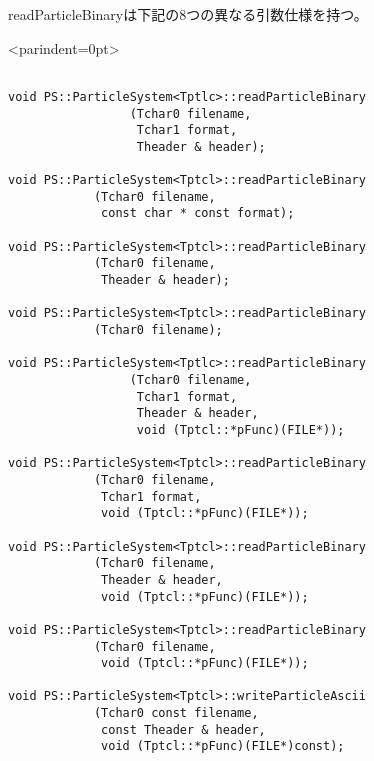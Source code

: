 \label{sec:readParticleBinary}

readParticleBinaryは下記の8つの異なる引数仕様を持つ。
\begin{breakitembox}<parindent=0pt>{}
\begin{verbatim}

void PS::ParticleSystem<Tptlc>::readParticleBinary
                 (Tchar0 filename,
                  Tchar1 format,
                  Theader & header);

void PS::ParticleSystem<Tptcl>::readParticleBinary
            (Tchar0 filename,
             const char * const format); 
             
void PS::ParticleSystem<Tptcl>::readParticleBinary
            (Tchar0 filename,
             Theader & header);

void PS::ParticleSystem<Tptcl>::readParticleBinary
            (Tchar0 filename);

void PS::ParticleSystem<Tptlc>::readParticleBinary
                 (Tchar0 filename,
                  Tchar1 format,
                  Theader & header,
                  void (Tptcl::*pFunc)(FILE*));
                 
void PS::ParticleSystem<Tptcl>::readParticleBinary
            (Tchar0 filename,
             Tchar1 format,
             void (Tptcl::*pFunc)(FILE*));

void PS::ParticleSystem<Tptcl>::readParticleBinary
            (Tchar0 filename,
             Theader & header,
             void (Tptcl::*pFunc)(FILE*));
             
void PS::ParticleSystem<Tptcl>::readParticleBinary
            (Tchar0 filename,
             void (Tptcl::*pFunc)(FILE*));

void PS::ParticleSystem<Tptcl>::writeParticleAscii
            (Tchar0 const filename,
             const Theader & header,
             void (Tptcl::*pFunc)(FILE*)const);

\end{verbatim}
\end{breakitembox}

